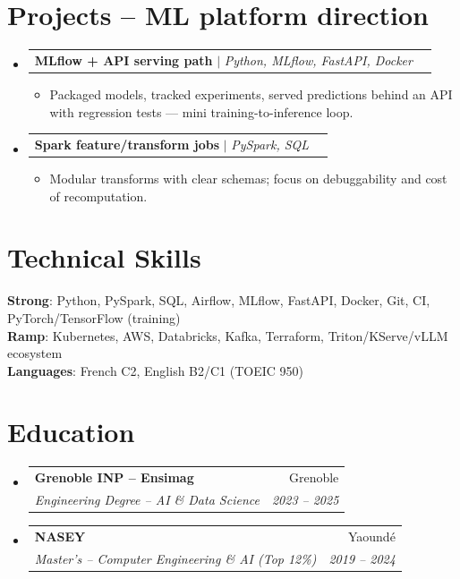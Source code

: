 \documentclass[letterpaper,10.5pt]{article}
\makeatletter
\newcommand{\resumeItem}[1]{\item\small{#1}}
\newcommand{\resumeSubheading}[4]{\vspace{4pt}\item\begin{tabular*}{0.97\textwidth}[t]{l@{\extracolsep{\fill}}r}\textbf{#1}&{#2}\\\textit{\small #3}&\textit{\small #4}\\\end{tabular*}\vspace{2pt}}
\newcommand{\resumeProjectHeading}[2]{\vspace{2pt}\item\begin{tabular*}{0.97\textwidth}{l@{\extracolsep{\fill}}r}\small #1&#2\\\end{tabular*}\vspace{1pt}}
\newcommand{\resumeSubHeadingListStart}{\begin{itemize}[leftmargin=0.08in,label={}]}
\newcommand{\resumeSubHeadingListEnd}{\end{itemize}}
\makeatother
\begin{document}
\section{Projects -- ML platform direction}
\resumeSubHeadingListStart
  \resumeProjectHeading{\textbf{MLflow + API serving path} $|$ \emph{Python, MLflow, FastAPI, Docker}}{}
  \begin{itemize}\resumeItem{Packaged models, tracked experiments, served predictions behind an API with regression tests --- mini training-to-inference loop.}\end{itemize}
  \resumeProjectHeading{\textbf{Spark feature/transform jobs} $|$ \emph{PySpark, SQL}}{}
  \begin{itemize}\resumeItem{Modular transforms with clear schemas; focus on debuggability and cost of recomputation.}\end{itemize}
\resumeSubHeadingListEnd

\section{Technical Skills}
\begin{itemize}[leftmargin=0.08in,label={}]\small{\item{
\textbf{Strong}: Python, PySpark, SQL, Airflow, MLflow, FastAPI, Docker, Git, CI, PyTorch/TensorFlow (training) \\
\textbf{Ramp}: Kubernetes, AWS, Databricks, Kafka, Terraform, Triton/KServe/vLLM ecosystem \\
\textbf{Languages}: French C2, English B2/C1 (TOEIC 950)
}}\end{itemize}

\section{Education}
\resumeSubHeadingListStart
  \resumeSubheading{Grenoble INP -- Ensimag}{Grenoble}{Engineering Degree -- AI \& Data Science}{2023 -- 2025}
  \resumeSubheading{NASEY}{Yaound\'e}{Master's -- Computer Engineering \& AI (Top 12\%)}{2019 -- 2024}
\resumeSubHeadingListEnd
\end{document}
